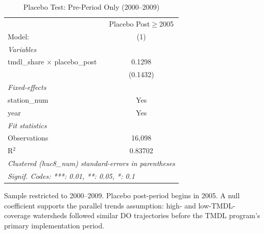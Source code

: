 
\begin{table}[htbp]
   \caption{\label{tab:placebo} Placebo Test: Pre-Period Only (2000--2009)}
   \centering
   \begin{tabular}{lc}
      \tabularnewline \midrule \midrule
                                            & Placebo Post$\geq$2005 \\    
      Model:                                & (1)\\  
      \midrule
      \emph{Variables}\\
      tmdl\_share $\times$ placebo\_post    & 0.1298\\   
                                            & (0.1432)\\   
      \midrule
      \emph{Fixed-effects}\\
      station\_num                          & Yes\\  
      year                                  & Yes\\  
      \midrule
      \emph{Fit statistics}\\
      Observations                          & 16,098\\  
      R$^2$                                 & 0.83702\\  
      \midrule \midrule
      \multicolumn{2}{l}{\emph{Clustered (huc8\_num) standard-errors in parentheses}}\\
      \multicolumn{2}{l}{\emph{Signif. Codes: ***: 0.01, **: 0.05, *: 0.1}}\\
   \end{tabular}
   
   \par \raggedright 
   Sample restricted to 2000--2009. Placebo post-period begins in 2005. A null coefficient supports the parallel trends assumption: high- and low-TMDL-coverage watersheds followed similar DO trajectories before the TMDL program's primary implementation period.
\end{table}


